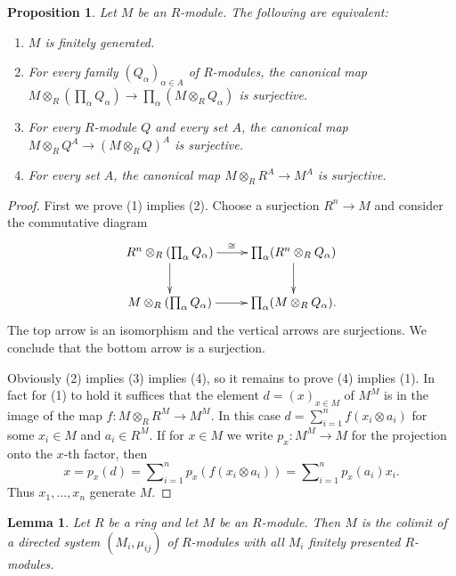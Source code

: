 \documentclass{amsart}
\theoremstyle{plain}
\newtheorem{proposition}[subsection]{Proposition}
\newtheorem{lemma}[subsection]{Lemma}
\theoremstyle{definition}
\theoremstyle{remark}
\numberwithin{equation}{subsection}
\begin{document}
\begin{proposition}
\label{proposition-fg-tensor}
Let $M$ be an $R$-module.  The following are equivalent:
\begin{enumerate}
\item $M$ is finitely generated.
\item For every family $(Q_{\alpha})_{\alpha \in A}$ of $R$-modules, the
canonical map $M \otimes_R \left( \prod_{\alpha} Q_{\alpha} \right)
\to \prod_{\alpha} (M \otimes_R Q_{\alpha})$ is surjective.
\item For every $R$-module $Q$ and every set $A$, the canonical map $M
\otimes_R Q^{A} \to (M \otimes_R Q)^{A}$ is surjective.
\item For every set $A$, the canonical map $M \otimes_R R^{A} \to
M^{A}$ is surjective.
\end{enumerate}
\end{proposition}

\begin{proof}
First we prove (1) implies (2).  Choose a surjection $R^n \to M$ and
consider the commutative diagram
$$
\xymatrix{
R^n \otimes_R (\prod_{\alpha} Q_{\alpha})  \ar[r]^{\cong} \ar[d] &
\prod_{\alpha} (R^n \otimes_R Q_{\alpha}) \ar[d] \\
M \otimes_R (\prod_{\alpha} Q_{\alpha})  \ar[r] & \prod_{\alpha} ( M
\otimes_R Q_{\alpha}).
}
$$
The top arrow is an isomorphism and the vertical arrows are surjections.  We
conclude that the bottom arrow is a surjection.

\medskip\noindent
Obviously (2) implies (3) implies (4), so it remains to prove (4) implies (1).
In fact for (1) to hold it suffices that the element $d = (x)_{x \in M}$ of
$M^M$ is in the image of the map $f: M \otimes_R R^{M} \to M^M$.  In
this case $d = \sum_{i = 1}^{n} f(x_i \otimes a_i)$ for some $x_i \in M$ and
$a_i \in R^M$.  If for $x \in M$ we write $p_x: M^M \to M$ for the
projection onto the $x$-th factor, then
$$
x = p_x(d) = \sum\nolimits_{i = 1}^{n} p_x(f(x_i \otimes a_i)) =
\sum\nolimits_{i=1}^{n} p_x(a_i) x_i.
$$
Thus $x_1, \ldots, x_n$ generate $M$.
\end{proof}


\begin{lemma}
\label{lemma-module-colimit-fp}
Let $R$ be a ring and let $M$ be an $R$-module.
Then $M$ is the colimit of a directed system
$(M_i, \mu_{ij})$ of $R$-modules
with all $M_i$ finitely presented $R$-modules.
\end{lemma}
\end{document}
